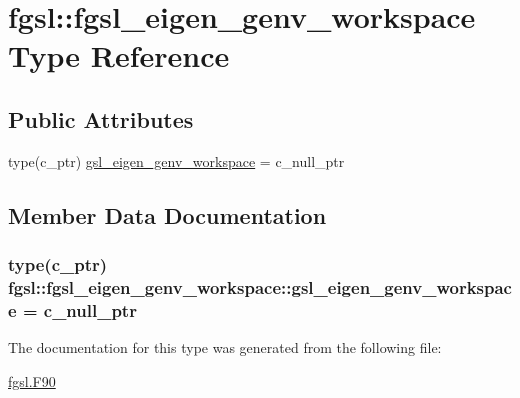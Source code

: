 \hypertarget{structfgsl_1_1fgsl__eigen__genv__workspace}{}\section{fgsl\+:\+:fgsl\+\_\+eigen\+\_\+genv\+\_\+workspace Type Reference}
\label{structfgsl_1_1fgsl__eigen__genv__workspace}
\subsection*{Public Attributes}
\begin{DoxyCompactItemize}
\item 
type(c\+\_\+ptr) \hyperlink{structfgsl_1_1fgsl__eigen__genv__workspace_ae144c3babedc9df6774d58a4106dcb19}{gsl\+\_\+eigen\+\_\+genv\+\_\+workspace} = c\+\_\+null\+\_\+ptr
\end{DoxyCompactItemize}


\subsection{Member Data Documentation}
\hypertarget{structfgsl_1_1fgsl__eigen__genv__workspace_ae144c3babedc9df6774d58a4106dcb19}{}
\subsubsection[{gsl\+\_\+eigen\+\_\+genv\+\_\+workspace}]{\setlength{\rightskip}{0pt plus 5cm}type(c\+\_\+ptr) fgsl\+::fgsl\+\_\+eigen\+\_\+genv\+\_\+workspace\+::gsl\+\_\+eigen\+\_\+genv\+\_\+workspace = c\+\_\+null\+\_\+ptr}\label{structfgsl_1_1fgsl__eigen__genv__workspace_ae144c3babedc9df6774d58a4106dcb19}


The documentation for this type was generated from the following file\+:\begin{DoxyCompactItemize}
\item 
\hyperlink{fgsl_8F90}{fgsl.\+F90}\end{DoxyCompactItemize}

